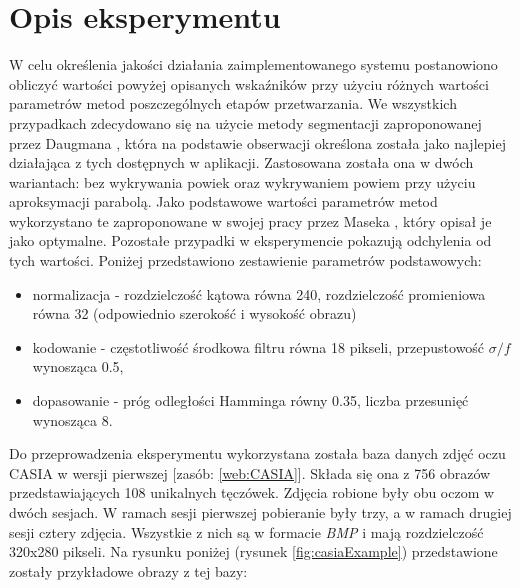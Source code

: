 \section{Opis eksperymentu}

W celu określenia jakości działania zaimplementowanego systemu postanowiono obliczy\'c wartości powyżej opisanych wska\'zników
przy użyciu różnych wartości parametrów metod poszczególnych etapów przetwarzania. We wszystkich przypadkach zdecydowano
się na użycie metody segmentacji zaproponowanej przez Daugmana \cite{DaugmanHowIrisRecognitionWorks}, która na podstawie obserwacji
określona została jako najlepiej działająca z tych dostępnych w aplikacji. Zastosowana została ona w dwóch wariantach:
bez wykrywania powiek oraz wykrywaniem powiem przy użyciu aproksymacji parabolą. Jako podstawowe wartości parametrów
metod wykorzystano te zaproponowane w swojej pracy przez Maseka \cite{masek}, który opisał je jako optymalne. Pozostałe
przypadki w eksperymencie pokazują odchylenia od tych wartości. Poniżej przedstawiono zestawienie parametrów podstawowych:

\begin{itemize}
  \item normalizacja - rozdzielczoś\'c kątowa równa 240, rozdzielczoś\'c promieniowa równa 32 (odpowiednio szerokoś\'c i wysokoś\'c obrazu)
  \item kodowanie - częstotliwoś\'c środkowa filtru równa 18 pikseli, przepustowoś\'c $\mathit{\sigma/f}$ wynosząca 0.5,
  \item dopasowanie - próg odległości Hamminga równy 0.35, liczba przesunię\'c wynosząca 8.
\end{itemize}

Do przeprowadzenia eksperymentu wykorzystana została baza danych zdję\'c oczu CASIA w wersji pierwszej [zasób: \ref{web:CASIA}].
Składa się ona z 756 obrazów przedstawiających 108 unikalnych tęczówek. Zdjęcia robione były obu oczom w dwóch
sesjach. W ramach sesji pierwszej pobieranie były trzy, a w ramach drugiej sesji cztery zdjęcia. Wszystkie z nich
są w formacie \textit{BMP} i mają rozdzielczoś\'c 320x280 pikseli. Na rysunku poniżej (rysunek \ref{fig:casiaExample})
przedstawione zostały przykładowe obrazy z tej bazy:\newline

